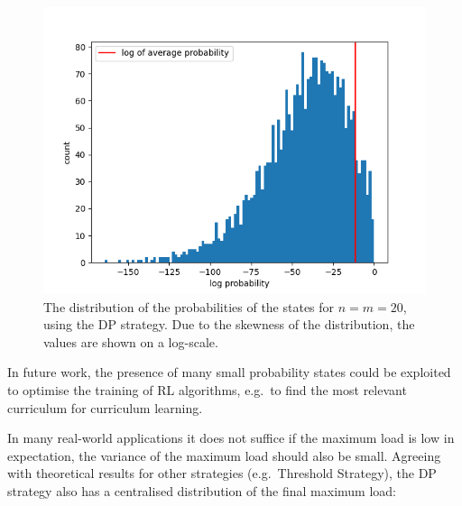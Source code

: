 \begin{figure}[hbt!] \label{two-thinning-state-distribution}
    \centering
    \includegraphics[scale=1.0]{Chapter4/Figs/state_distribution_20_20_all_log_count.png}
    \caption{The distribution of the probabilities of the states for $n=m=20$, using the DP strategy. Due to the skewness of the distribution, the values are shown on a log-scale.}
\end{figure}


In future work, the presence of many small probability states could be exploited to optimise the training of RL algorithms, e.g.\ to find the most relevant curriculum for curriculum learning. 


In many real-world applications it does not suffice if the maximum load is low in expectation, the variance of the maximum load should also be small. Agreeing with theoretical results for other strategies (e.g.\ Threshold Strategy), the DP strategy also has a centralised distribution of the final maximum load:



